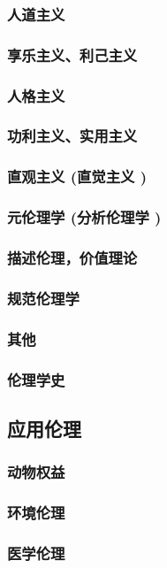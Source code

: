 \documentclass[UTF8]{../RepresentationUniverse}
\begin{document}
        \subsubsection{人道主义}
        \subsubsection{享乐主义、利己主义}
        \subsubsection{人格主义}
        \subsubsection{功利主义、实用主义}
        \subsubsection{直观主义 (直觉主义 )}
        \subsubsection{元伦理学 (分析伦理学 )}
        \subsubsection{描述伦理，价值理论}
        \subsubsection{规范伦理学}
        \subsubsection{其他}
    \subsubsection{伦理学史}

    \subsection{应用伦理}
        \subsubsection{动物权益}
        \subsubsection{环境伦理}
        \subsubsection{医学伦理}
\end{document}
